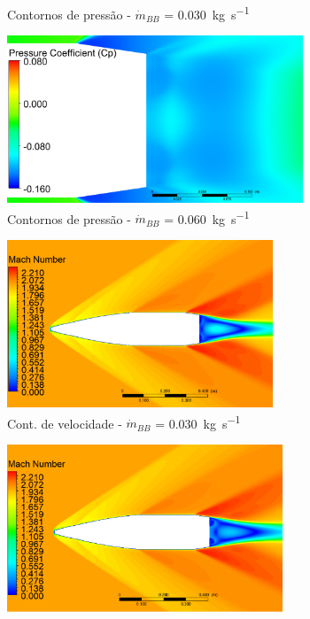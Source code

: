 \begin{figure}[!htpb]
\begin{subfigure}[b]{0.47\textwidth}
        \caption{Contornos de pressão - \(\Dot{m}_{BB}\) = \qty{0,030}{\kilogram\per\second}}
        \label{fig:contorno-pressao-base-bb-2pol-vazao0030}
    \end{subfigure}
    \hfill
    \begin{subfigure}[b]{0.47\textwidth} %
        \centering
        \includegraphics[height=5cm,width=\textwidth]{coeficientepressao-vazao0060-temp2306-diam2pol.png}
        \caption{Contornos de pressão - \(\Dot{m}_{BB}\) = \qty{0,060}{\kilogram\per\second}}
        \label{fig:contorno-pressao-base-bb-2pol-vazao0060}
    \end{subfigure}
    \hfill
    \begin{subfigure}[b]{0.47\textwidth} %
        \centering
        \includegraphics[height=5cm,width=\textwidth]{contorno-velocidade-2306K-vazao-0030-2pol.png}
        \caption{Cont. de velocidade - \(\Dot{m}_{BB}\) = \qty{0,030}{\kilogram\per\second}}
        \label{fig:contorno-velocidade-bb-2pol-vazao0030}
    \end{subfigure}
    \hfill
	\begin{subfigure}[b]{0.47\textwidth} %
        \centering
        \includegraphics[height=5cm,width=\textwidth]{contorno-velocidade-2306K-vazao-0060-2pol.png}

\end{subfigure}
\end{figure}
